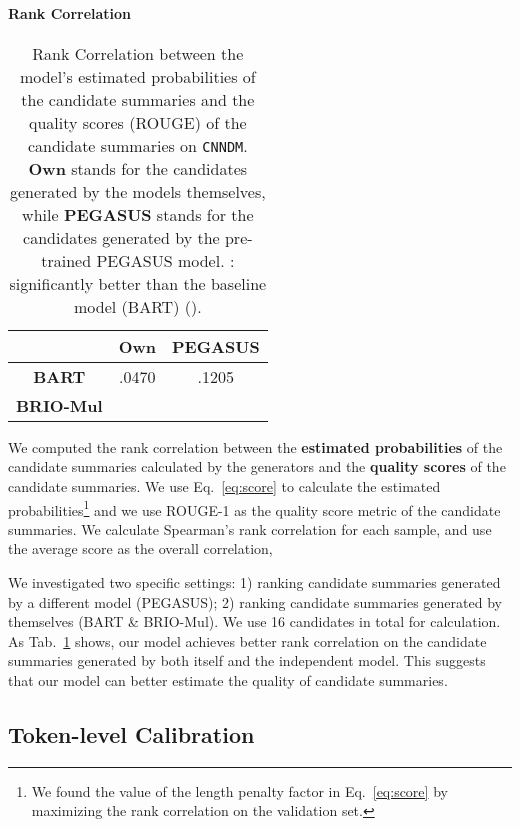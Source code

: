 \documentclass[11pt]{article}
\newcommand{\model}{BRIO\xspace}
\begin{document}
\paragraph{Rank Correlation}

\begin{table}[t!]
\centering
\small
\begin{tabular}{c|c|c}
\toprule
   & \textbf{Own} & \textbf{PEGASUS} \\
 \midrule
\textbf{BART} & .0470  & .1205  \\
\midrule
\textbf{\model-Mul} &   &  \\
\bottomrule
\end{tabular}
\caption{\label{tab:rank_correlation} Rank Correlation between the model's estimated probabilities of the candidate summaries and the quality scores (ROUGE) of the candidate summaries on \texttt{CNNDM}.
\textbf{Own} stands for the candidates generated by the models themselves, while \textbf{PEGASUS} stands for the candidates generated by the pre-trained PEGASUS model.
\dag: significantly better than the baseline model (BART) ().
}
\end{table}

We computed the rank correlation between the \textbf{estimated probabilities} of the candidate summaries calculated by the generators and the \textbf{quality scores} of the candidate summaries. 
We use Eq.~\ref{eq:score} to calculate the estimated probabilities\footnote{We found the value of the length penalty factor  in Eq.~\ref{eq:score} by maximizing the rank correlation on the validation set.} and we use ROUGE-1 as the quality score metric of the candidate summaries.
We calculate Spearman's rank correlation for each sample, and use the average score as the overall correlation, 

We investigated two specific settings: 1) ranking candidate summaries generated by a different model (PEGASUS); 2) ranking candidate summaries generated by themselves (BART \& \model-Mul).
We use 16 candidates in total for calculation. 
As Tab.~\ref{tab:rank_correlation} shows, our model achieves better rank correlation on the candidate summaries generated by both itself and the independent model.
This suggests that our model can better estimate the quality of candidate summaries. 




\subsection{Token-level Calibration}
\end{document}
